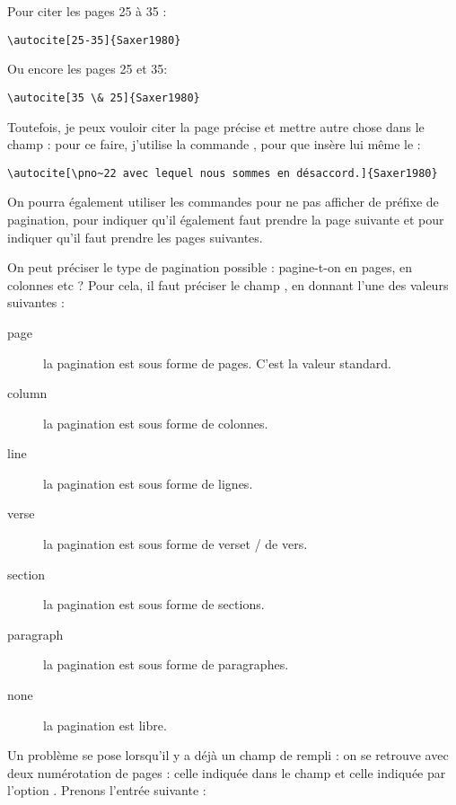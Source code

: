  Pour citer les pages 25 à 35 :

\begin{verbatim}
\autocite[25-35]{Saxer1980}
\end{verbatim}

Ou encore les pages 25 et 35:

\begin{verbatim}
\autocite[35 \& 25]{Saxer1980}
\end{verbatim}

Toutefois, je peux vouloir citer la page précise et mettre autre chose dans le champ  : pour ce faire, j'utilise la commande , pour que  insère lui même le  :

\begin{verbatim}
\autocite[\pno~22 avec lequel nous sommes en désaccord.]{Saxer1980}
\end{verbatim}

\begin{quotation}
	\parencite[\pno~22 avec lequel nous sommes en désaccord.]{Saxer1980}
\end{quotation}

On pourra également utiliser les commandes  pour ne pas afficher de préfixe de pagination,   pour indiquer qu'il également faut prendre la page suivante et  pour indiquer qu'il faut prendre les pages suivantes.

On peut préciser le type de pagination possible : pagine-t-on en pages, en colonnes etc ? Pour cela, il faut préciser le champ , en donnant l'une des valeurs suivantes : 

\begin{description}
\item[page]la pagination est sous forme de pages. C'est la valeur standard.
\item[column]la pagination est sous forme de colonnes.
\item[line]la pagination est sous forme de lignes.
\item[verse]la pagination est sous forme de verset / de vers. 
\item[section]la pagination est sous forme de sections.
\item[paragraph]la pagination est sous forme de paragraphes.
\item[none]la pagination est libre.
\end{description}



Un problème se pose lorsqu'il y a déjà un champ  de rempli : on se retrouve avec deux numérotation de pages : celle indiquée dans le champ  et celle indiquée par l'option . Prenons l'entrée suivante :

